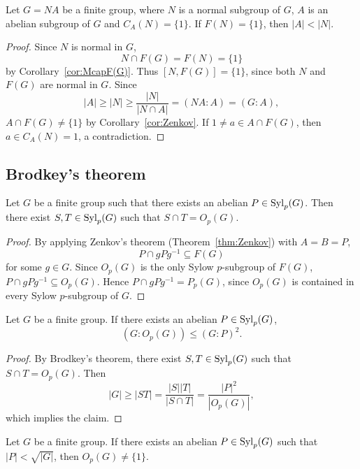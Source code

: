 \begin{corollary}
	Let $G=NA$ be a finite group, where $N$ is a normal subgroup of $G$, $A$ is an abelian subgroup of $G$ and 
	$C_A(N)=\{1\}$. If $F(N)=\{1\}$, then $|A|<|N|$. 
\end{corollary}

\begin{proof}
	Since $N$ is normal in $G$, 
	\[
    N\cap F(G)=F(N)=\{1\}
    \]
    by Corollary~\ref{cor:McapF(G)}. Thus $[N,F(G)]=\{1\}$, since 
	both $N$ and $F(G)$ are normal in $G$. Since 
	\[
	|A|\geq |N|\geq \frac{|N|}{|N\cap A|}=(NA:A)=(G:A),
	\]
	$A\cap F(G)\ne\{1\}$ by Corollary~\ref{cor:Zenkov}. If $1\ne a\in
	A\cap F(G)$, then $a\in C_A(N)=1$, a contradiction. 
\end{proof}

\subsection{Brodkey's theorem}

\begin{theorem}[Brodkey]
	\label{thm:Brodkey}
	Let $G$ be a finite group such that there exists an abelian $P\in\mathrm{Syl}_p(G)$. Then
    there exist $S,T\in\mathrm{Syl}_p(G)$ such that $S\cap T=O_p(G)$.
\end{theorem}

\begin{proof}
	By applying Zenkov's theorem (Theorem~\ref{thm:Zenkov}) with $A=B=P$, 
	\[
    P\cap gPg^{-1}\subseteq F(G)
    \]
    for some $g\in G$. Since $O_p(G)$ is the only Sylow $p$-subgroup of 
	$F(G)$, $P\cap gPg^{-1}\subseteq O_p(G)$.
	Hence $P\cap gPg^{-1}=P_p(G)$, since $O_p(G)$ is contained in every Sylow $p$-subgroup 
	of $G$. 
\end{proof}

\begin{corollary}
	\label{corollary:GP2}
	Let $G$ be a finite group. If there exists an abelian $P\in \mathrm{Syl}_p(G)$, 
	\[
	(G:O_p(G))\leq (G:P)^2. 
	\]
\end{corollary}

\begin{proof}
	By Brodkey's theorem, there exist $S,T\in\mathrm{Syl}_p(G)$
	such that $S\cap T=O_p(G)$. Then 
	\[
		|G|\geq |ST|=\frac{|S||T|}{|S\cap T|}=\frac{|P|^2}{|O_p(G)|},
	\]
	which implies the claim. 
\end{proof}

\begin{corollary}
	Let $G$ be a finite group. If there exists an abelian $P\in\mathrm{Syl}_p(G)$ such that 
	$|P|<\sqrt{|G|}$, then $O_p(G)\ne\{1\}$.
\end{corollary}

